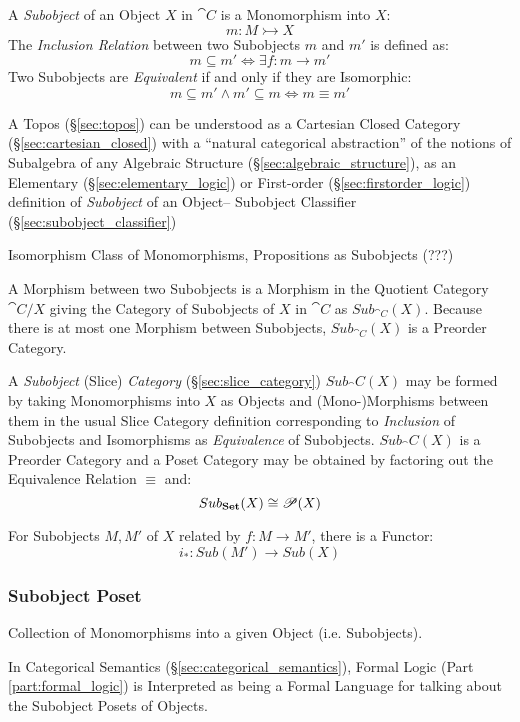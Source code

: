 A \emph{Subobject} of an Object $X$ in $\cat{C}$ is a Monomorphism
into $X$:
\[
  m : M \rightarrowtail X
\]
The \emph{Inclusion Relation} between two Subobjects $m$ and $m'$ is
defined as:
\[
  m \subseteq m' \Leftrightarrow \exists f : m \rightarrow m'
\]
Two Subobjects are \emph{Equivalent} if and only if they are
Isomorphic:
\[
  m \subseteq m' \wedge m' \subseteq m \Leftrightarrow m \equiv m'
\]

\fist A Topos (\S\ref{sec:topos}) can be understood as a Cartesian Closed
Category (\S\ref{sec:cartesian_closed}) with a ``natural categorical
abstraction'' of the notions of Subalgebra of any Algebraic Structure
(\S\ref{sec:algebraic_structure}), as an Elementary
(\S\ref{sec:elementary_logic}) or First-order (\S\ref{sec:firstorder_logic})
definition of \emph{Subobject} of an Object-- Subobject Classifier
(\S\ref{sec:subobject_classifier})

Isomorphism Class of Monomorphisms, Propositions as Subobjects (???)

A Morphism between two Subobjects is a Morphism in the Quotient
Category $\cat{C}/X$ giving the Category of Subobjects of $X$ in
$\cat{C}$ as $Sub_{\cat{C}}(X)$. Because there is at most one
Morphism between Subobjects, $Sub_{\cat{C}}(X)$ is a Preorder
Category.

A \emph{Subobject} (Slice) \emph{Category}
(\S\ref{sec:slice_category}) $Sub_\cat{C}(X)$ may be formed by
taking Monomorphisms into $X$ as Objects and (Mono-)Morphisms between
them in the usual Slice Category definition corresponding to
\emph{Inclusion} of Subobjects and Isomorphisms as \emph{Equivalence}
of Subobjects. $Sub_\cat{C}(X)$ is a Preorder Category and a Poset
Category may be obtained by factoring out the Equivalence Relation
$\equiv$ and:
\[
  Sub_\mathbf{Set}(X) \cong \mathscr{P}(X)
\]

For Subobjects $M,M'$ of $X$ related by $f : M \rightarrow M'$, there
is a Functor:
\[
  i_* : Sub (M') \rightarrow Sub (X)
\]



\subsubsection{Subobject Poset}\label{sec:subobject_poset}

Collection of Monomorphisms into a given Object (i.e. Subobjects).

In Categorical Semantics (\S\ref{sec:categorical_semantics}), Formal
Logic (Part \ref{part:formal_logic}) is Interpreted as being a Formal
Language for talking about the Subobject Posets of Objects.



